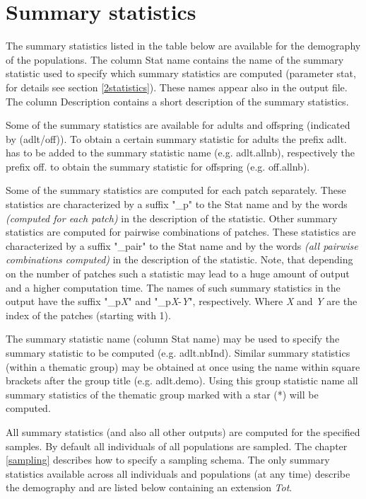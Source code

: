 \documentclass[letterpaper,12pt,oneside]{book}
\begin{document}
\section{Summary statistics}\label{ssPops}
The summary statistics listed in the table below are available for the demography of the populations. The column \textsf{Stat name} contains the name of the summary statistic used to specify which summary statistics are computed (parameter \textsf{stat}, for details see section \ref{2statistics}). These names appear also in the output file. The column \textsf{Description} contains a short description of the summary statistics. 

Some of the summary statistics are available for adults and offspring (indicated by \textsf{(adlt/off)}). To obtain a certain summary statistic for adults the prefix \textsf{adlt.} has to be added to the summary statistic name (e.g. \textsf{adlt.allnb}), respectively the prefix \textsf{off.} to obtain the summary statistic for offspring (e.g. \textsf{off.allnb}). 

Some of the summary statistics are computed for each patch separately. These statistics are characterized by a suffix "\_p" to the \textsf{Stat name} and by the words \textit{(computed for each patch)} in the description of the statistic. Other summary statistics are computed for pairwise combinations of patches. These statistics are characterized by a suffix "\_pair" to the \textsf{Stat name} and by the words \textit{(all pairwise combinations computed)} in the description of the statistic. Note, that depending on the number of patches such a statistic may lead to a huge amount of output and a higher computation time. The names of such summary statistics in the output have the suffix "\_p\textit{X}" and "\_p\textit{X}-\textit{Y}", respectively. Where \textit{X} and \textit{Y} are the index of the patches (starting with 1). 

The summary statistic name (column \textsf{Stat name}) may be used to specify the summary statistic to be computed (e.g. \textsf{adlt.nbInd}). Similar summary statistics (within a thematic group) may be obtained at once using the name within square brackets after the group title (e.g. \textsf{adlt.demo}). Using this group statistic name all summary statistics of the thematic group marked with a star (*) will be computed.

All summary statistics (and also all other outputs) are computed for the specified samples. By default all individuals of all populations are sampled. The chapter \ref{sampling} describes how to specify a sampling schema. The only summary statistics available across all individuals and populations (at any time) describe the demography and are listed below containing an extension \textit{Tot}.   
\\
\\
\end{document}
